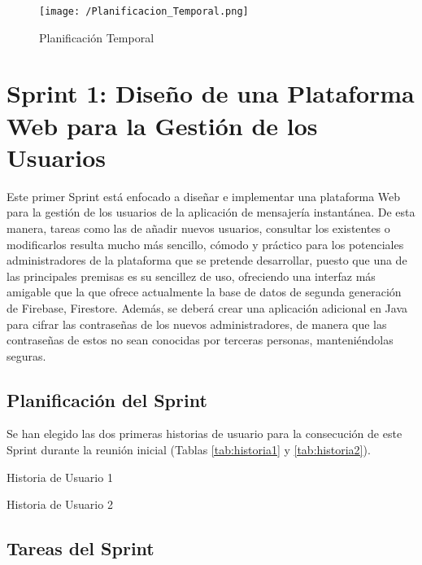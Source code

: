 \begin{figure}[!h]
	\begin{center}
		\texttt{[image: /Planificacion\_Temporal.png]}
		\caption{Planificación Temporal}
		\label{fig:plantempo}
	\end{center}
\end{figure}

\clearpage

\section{Sprint 1: Diseño de una Plataforma Web para la Gestión de los Usuarios}
Este primer Sprint está enfocado a diseñar e implementar una plataforma Web para la gestión de los usuarios de la aplicación de mensajería instantánea. De esta manera, tareas como las de añadir nuevos usuarios, consultar los existentes o modificarlos resulta mucho más sencillo, cómodo y práctico para los potenciales administradores de la plataforma que se pretende desarrollar, puesto que una de las principales premisas es su sencillez de uso, ofreciendo una interfaz más amigable que la que ofrece actualmente la base de datos de segunda generación de Firebase, Firestore. Además, se deberá crear una aplicación adicional en Java para cifrar las contraseñas de los nuevos administradores, de manera que las contraseñas de estos no sean conocidas por terceras personas, manteniéndolas seguras.

\subsection{Planificación del Sprint}
Se han elegido las dos primeras historias de usuario para la consecución de este Sprint durante la reunión inicial (Tablas \ref{tab:historia1} y \ref{tab:historia2}).

\begin{table}[!htbp]
	\centering
	{\small
		
	}
	\caption[Historia de Usuario 1]
	{Historia de Usuario 1}
	\label{tab:historia1}
\end{table}

\begin{table}[!htbp]
	\centering
	{\small
		
	}
	\caption[Historia de Usuario 2]
	{Historia de Usuario 2}
	\label{tab:historia2}
\end{table}

\subsection{Tareas del Sprint}
